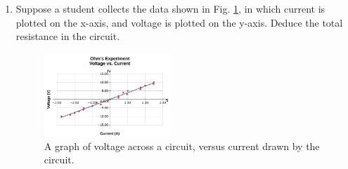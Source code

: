 \documentclass{article}
\begin{document}
\begin{enumerate}
\item Suppose a student collects the data shown in Fig. \ref{fig:ohm1}, in which current is plotted on the x-axis, and voltage is plotted on the y-axis.  Deduce the total resistance in the circuit.
\begin{figure}[ht]
\centering
\includegraphics[width=0.45\textwidth]{ohm1.png}
\caption{\label{fig:ohm1} A graph of voltage across a circuit, versus current drawn by the circuit.}
\end{figure}
\end{enumerate}
\end{document}
